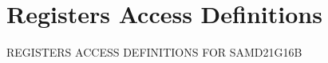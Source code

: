 \hypertarget{group___s_a_m_d21_g16_b__reg}{}\section{Registers Access Definitions}
\label{group___s_a_m_d21_g16_b__reg}
R\+E\+G\+I\+S\+T\+E\+RS A\+C\+C\+E\+SS D\+E\+F\+I\+N\+I\+T\+I\+O\+NS F\+OR S\+A\+M\+D21\+G16B 